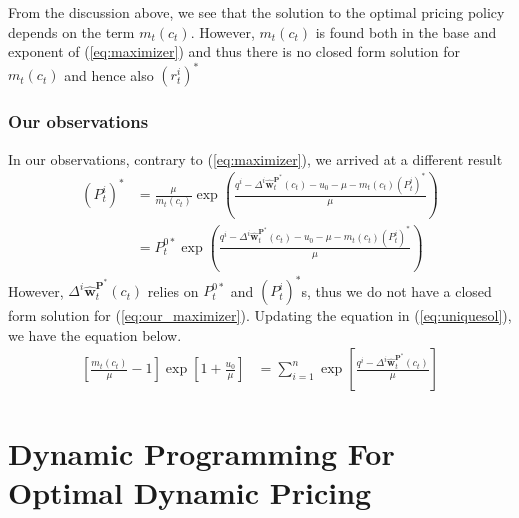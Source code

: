 From the discussion above, we see that the solution to the optimal pricing policy depends on the term $m_t(c_t)$. However, $m_t(c_t)$ is found both in the base and exponent of (\ref{eq:maximizer}) and thus there is no closed form solution for $m_t(c_t)$ and hence also $(r_t^i)^\ast$



\subsubsection{Our observations}

In our observations, contrary to (\ref{eq:maximizer}), we arrived at a different result
\begin{align}
(P_t^i)^\ast &= \frac{\mu}{m_t(c_t)}\exp \left(\frac{q^i-\Delta^i \hat{\mathbf{w}}_t^{\mathbf{P}^\ast}(c_t)-u_0 - \mu- m_t(c_t)(P_t^i)^\ast}{\mu}\right)\nonumber\\
&= P_t^{0\ast}\exp \left(\frac{q^i-\Delta^i \hat{\mathbf{w}}_t^{\mathbf{P}^\ast}(c_t)-u_0 - \mu - m_t(c_t)(P_t^i)^\ast}{\mu}\right)\label{eq:our_maximizer}
\end{align}
%
However,  $\Delta^i \hat{\mathbf{w}}_t^{\mathbf{P}^\ast}(c_t)$ relies on $P_t^{0\ast}$ and $(P_t^i)^\ast$s, thus we do not have a closed form solution for (\ref{eq:our_maximizer}). Updating the equation in (\ref{eq:uniquesol}), we have the equation below.
\begin{align}
\left[\frac{m_t(c_t)}{\mu}-1\right] \exp \left[1+\frac{u_0}{\mu}\right] &= \sum_{i=1}^{n}\exp \left[\frac{q^i-\Delta^i \hat{\mathbf{w}}_t^{\mathbf{P}^\ast}(c_t)}{\mu}\right]\label{eq:our_uniquesol}
\end{align}








\section{Dynamic Programming For Optimal Dynamic Pricing}


